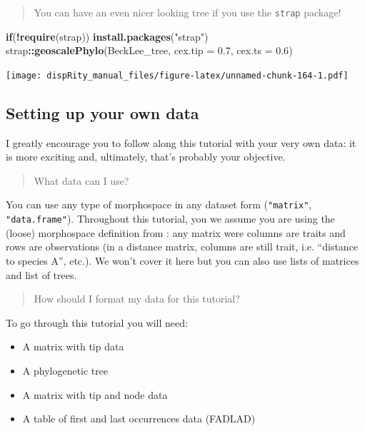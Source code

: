 \documentclass[]{book}
\newenvironment{Shaded}{\begin{snugshade}}{\end{snugshade}}
\newcommand{\ControlFlowTok}[1]{\textcolor[rgb]{0.13,0.29,0.53}{\textbf{#1}}}
\newcommand{\DataTypeTok}[1]{\textcolor[rgb]{0.13,0.29,0.53}{#1}}
\newcommand{\FloatTok}[1]{\textcolor[rgb]{0.00,0.00,0.81}{#1}}
\newcommand{\KeywordTok}[1]{\textcolor[rgb]{0.13,0.29,0.53}{\textbf{#1}}}
\newcommand{\NormalTok}[1]{#1}
\newcommand{\OperatorTok}[1]{\textcolor[rgb]{0.81,0.36,0.00}{\textbf{#1}}}
\newcommand{\StringTok}[1]{\textcolor[rgb]{0.31,0.60,0.02}{#1}}
\providecommand{\tightlist}{%
  \setlength{\itemsep}{0pt}\setlength{\parskip}{0pt}}
\begin{document}
\begin{quote}
You can have an even nicer looking tree if you use the \texttt{strap} package!
\end{quote}

\begin{Shaded}
\begin{Highlighting}[]
\ControlFlowTok{if}\NormalTok{(}\OperatorTok{!}\KeywordTok{require}\NormalTok{(strap)) }\KeywordTok{install.packages}\NormalTok{(}\StringTok{"strap"}\NormalTok{)}
\NormalTok{strap}\OperatorTok{::}\KeywordTok{geoscalePhylo}\NormalTok{(BeckLee_tree, }\DataTypeTok{cex.tip =} \FloatTok{0.7}\NormalTok{, }\DataTypeTok{cex.ts =} \FloatTok{0.6}\NormalTok{)}
\end{Highlighting}
\end{Shaded}

\texttt{[image: dispRity\_manual\_files/figure-latex/unnamed-chunk-164-1.pdf]}

\hypertarget{setting-up-your-own-data}{%
\subsection{Setting up your own data}\label{setting-up-your-own-data}}

I greatly encourage you to follow along this tutorial with your very own data: it is more exciting and, ultimately, that's probably your objective.

\begin{quote}
What data can I use?
\end{quote}

You can use any type of morphospace in any dataset form (\texttt{"matrix"}, \texttt{"data.frame"}). Throughout this tutorial, you we assume you are using the (loose) morphospace definition from \citet{Guillerme2020}: any matrix were columns are traits and rows are observations (in a distance matrix, columns are still trait, i.e. ``distance to species A'', etc.).
We won't cover it here but you can also use lists of matrices and list of trees.

\begin{quote}
How should I format my data for this tutorial?
\end{quote}

To go through this tutorial you will need:

\begin{itemize}
\tightlist
\item
  A matrix with tip data
\item
  A phylogenetic tree
\item
  A matrix with tip and node data
\item
  A table of first and last occurrences data (FADLAD)
\end{itemize}
\end{document}
